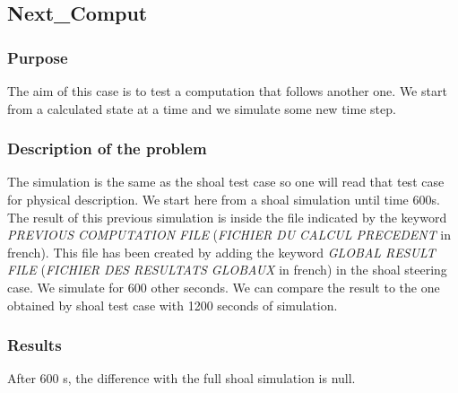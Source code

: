 \subsection{Next\_Comput}

\subsubsection{Purpose}
%
The aim of this case is to test a computation that follows another one. We start from a calculated state at a time and we simulate some new time step.  
%
\subsubsection{Description of the problem}
%
The simulation is the same as the shoal test case so one will read that test case for physical description. We start here from a shoal simulation until time 600s. The result of this previous simulation is inside the file indicated by the keyword {\it PREVIOUS COMPUTATION FILE} ({\it FICHIER DU CALCUL PRECEDENT} in french). This file has been created by adding the keyword  {\it GLOBAL RESULT FILE} ({\it FICHIER DES RESULTATS GLOBAUX} in french) in the shoal steering case. 
We simulate for 600 other seconds. We can compare the result to the one obtained by shoal test case with 1200 seconds of simulation. 

\subsubsection{Results}
After 600 s, the difference with the full shoal simulation is null. 